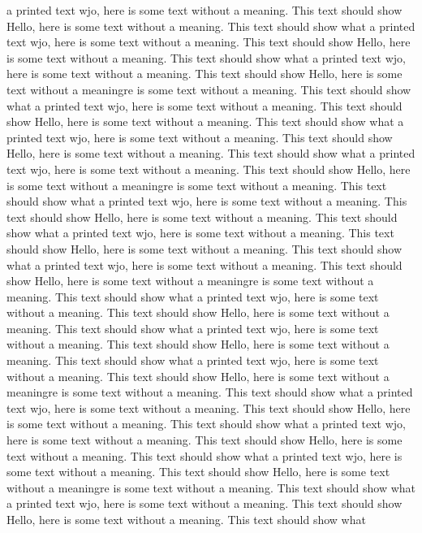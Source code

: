 \documentclass{article}
\begin{document}
\begin{multicols}{3}
a printed text wjo, here is some text without a meaning.  This text should show 
Hello, here is some text without a meaning.  This text should show what 
a printed text wjo, here is some text without a meaning.  This text should show 
Hello, here is some text without a meaning.  This text should show what 
a printed text wjo, here is some text without a meaning.  This text should show 
Hello, here is some text without a meaningre is some text without a meaning.  This text should show what 
a printed text wjo, here is some text without a meaning.  This text should show 
Hello, here is some text without a meaning.  This text should show what 
a printed text wjo, here is some text without a meaning.  This text should show 
Hello, here is some text without a meaning.  This text should show what 
a printed text wjo, here is some text without a meaning.  This text should show 
Hello, here is some text without a meaningre is some text without a meaning.  This text should show what 
a printed text wjo, here is some text without a meaning.  This text should show 
Hello, here is some text without a meaning.  This text should show what 
a printed text wjo, here is some text without a meaning.  This text should show 
Hello, here is some text without a meaning.  This text should show what 
a printed text wjo, here is some text without a meaning.  This text should show 
Hello, here is some text without a meaningre is some text without a meaning.  This text should show what 
a printed text wjo, here is some text without a meaning.  This text should show 
Hello, here is some text without a meaning.  This text should show what 
a printed text wjo, here is some text without a meaning.  This text should show 
Hello, here is some text without a meaning.  This text should show what 
a printed text wjo, here is some text without a meaning.  This text should show 
Hello, here is some text without a meaningre is some text without a meaning.  This text should show what 
a printed text wjo, here is some text without a meaning.  This text should show 
Hello, here is some text without a meaning.  This text should show what 
a printed text wjo, here is some text without a meaning.  This text should show 
Hello, here is some text without a meaning.  This text should show what 
a printed text wjo, here is some text without a meaning.  This text should show 
Hello, here is some text without a meaningre is some text without a meaning.  This text should show what 
a printed text wjo, here is some text without a meaning.  This text should show 
Hello, here is some text without a meaning.  This text should show what 

\end{multicols}
\end{document}
